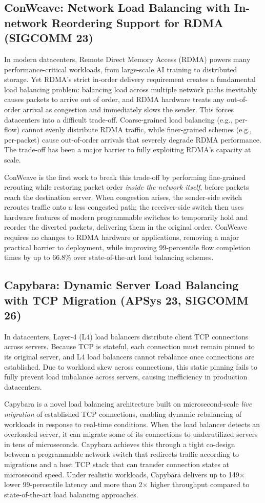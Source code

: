 \documentclass[11pt,letterpaper]{article}
\newcommand{\yr}[1]{\raisebox{0.4ex}{\fontsize{8pt}{8pt}\selectfont\textquotesingle}#1}
\begin{document}
\subsection{ConWeave: Network Load Balancing with In-network Reordering Support for RDMA (SIGCOMM \yr{23})~\cite{conweave}}
In modern datacenters, Remote Direct Memory Access (RDMA) powers many performance-critical workloads, from large-scale AI training to distributed storage.
Yet RDMA's strict in-order delivery requirement creates a fundamental load balancing problem: balancing load across multiple network paths inevitably causes packets to arrive out of order, and RDMA hardware treats any out-of-order arrival as congestion and immediately slows the sender.
This forces datacenters into a difficult trade-off.
Coarse-grained load balancing (e.g., per-flow) cannot evenly distribute RDMA traffic, while finer-grained schemes (e.g., per-packet) cause out-of-order arrivals that severely degrade RDMA performance.
The trade-off has been a major barrier to fully exploiting RDMA's capacity at scale.

ConWeave is the first work to break this trade-off by performing fine-grained rerouting while restoring packet order \emph{inside the network itself}, before packets reach the destination server.
When congestion arises, the sender-side switch reroutes traffic onto a less congested path; the receiver-side switch then uses hardware features of modern programmable switches to temporarily hold and reorder the diverted packets, delivering them in the original order.
ConWeave requires no changes to RDMA hardware or applications, removing a major practical barrier to deployment, while improving 99-percentile flow completion times by up to 66.8\% over state-of-the-art load balancing schemes.

\subsection{Capybara: Dynamic Server Load Balancing with TCP Migration (APSys \yr{23}, SIGCOMM \yr{26})~\cite{capybara_apsys, capybara_sigcomm}}
In datacenters, Layer-4 (L4) load balancers distribute client TCP connections across servers.
Because TCP is stateful, each connection must remain pinned to its original server, and L4 load balancers cannot rebalance once connections are established.
Due to workload skew across connections, this static pinning fails to fully prevent load imbalance across servers, causing inefficiency in production datacenters.

Capybara is a novel load balancing architecture built on microsecond-scale \emph{live migration} of established TCP connections, enabling dynamic rebalancing of workloads in response to real-time conditions.
When the load balancer detects an overloaded server, it can migrate some of its connections to underutilized servers in tens of microseconds.
Capybara achieves this through a tight co-design between a programmable network switch that redirects traffic according to migrations and a host TCP stack that can transfer connection states at microsecond speed.
Under realistic workloads, Capybara delivers up to 149$\times$ lower 99-percentile latency and more than 2$\times$ higher throughput compared to state-of-the-art load balancing approaches.
\end{document}
